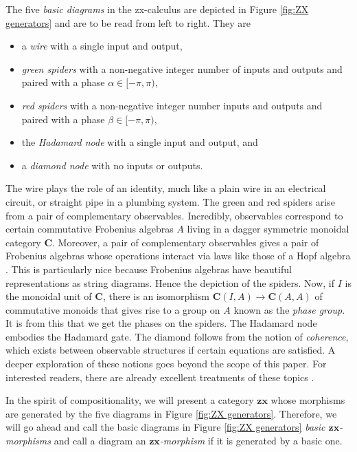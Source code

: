 \documentclass[a4paper,UKenglish]{lipics-v2016}
\begin{document}
The five \emph{basic diagrams} in the zx-calculus are depicted in Figure \ref{fig:ZX generators} and are to be read from left to right. They are
\begin{itemize}
	\item a \emph{wire} with a single input and output,
	\item \emph{green spiders} with a non-negative integer number of inputs and outputs and paired with a phase $\alpha \in [-\pi,\pi)$,
	\item \emph{red spiders} with a non-negative integer number inputs and outputs and paired with a phase $\beta \in [-\pi,\pi)$,
	\item the \emph{Hadamard node} with a single input and output, and
	\item a \emph{diamond node} with no inputs or outputs.
\end{itemize}
The wire plays the role of an identity, much like a plain wire in an electrical circuit, or straight pipe in a plumbing system. The green and red spiders arise from a pair of complementary observables.  Incredibly, observables correspond to certain commutative Frobenius algebras $A$ living in a dagger symmetric monoidal category $\mathbf{C}$. Moreover, a pair of complementary observables gives a pair of Frobenius algebras whose operations interact via laws like those of a Hopf algebra \cite{CoeckePavlovic_QuantumMeasSums, CoeckePavVicary_OrthBasis}.  This is particularly nice because Frobenius algebras have beautiful representations as string diagrams. Hence the depiction of the spiders. Now, if $I$ is the monoidal unit of $\mathbf{C}$, there is an isomorphism $\mathbf{C}(I,A) \to \mathbf{C}(A,A)$ of commutative monoids that gives rise to a group on $A$ known as the \emph{phase group}.  It is from this that we get the phases on the spiders. The Hadamard node embodies the Hadamard gate. The diamond follows from the notion of \emph{coherence}, which exists between observable structures if certain equations are satisfied.  A deeper exploration of these notions goes beyond the scope of this paper.  For interested readers, there are already excellent treatments of these topics \cite{CoeckeDuncan_QuantumObsFullPaper}.

In the spirit of compositionality, we will present a category $\mathbf{zx}$ whose morphisms are generated by the five diagrams in Figure \ref{fig:ZX generators}. Therefore, we will go ahead and call the basic diagrams in Figure \ref{fig:ZX generators} \emph{basic $\mathbf{zx}$-morphisms} and call a diagram an \emph{$\mathbf{zx}$-morphism} if it is generated by a basic one.
\end{document}
